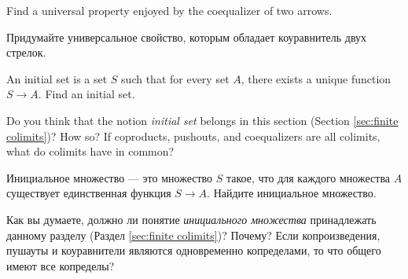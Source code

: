 \documentclass[CT4S-EN-RU]{subfiles}
\begin{document}
\begin{exerciseENG}
Find a universal property enjoyed by the coequalizer of two arrows.
\end{exerciseENG}

\begin{exerciseRUS}
Придумайте универсальное свойство, которым обладает коуравнитель двух стрелок.
\end{exerciseRUS}

\begin{exerciseENG}\label{exc:initial set}
An initial set is a set $S$ such that for every set $A$, there exists a unique function $S\to A$. 
\sexc Find an initial set. 
\item Do you think that the notion {\em initial set} belongs in this section (Section \ref{sec:finite colimits})? How so? If coproducts, pushouts, and coequalizers are all colimits, what do colimits have in common?
\endsexc
\end{exerciseENG}

\begin{exerciseRUS}\label{exc:initial set}
Инициальное множество — это множество $S$ такое, что для каждого множества $A$ существует единственная функция $S\to A$. 
\sexc Найдите инициальное множество. 
\item Как вы думаете, должно ли понятие {\em инициального множества} принадлежать данному разделу (Раздел \ref{sec:finite colimits})? Почему? Если копроизведения, пушауты и коуравнители являются одновременно копределами, то что общего имеют все копределы?
\endsexc
\end{exerciseRUS}
\end{document}
